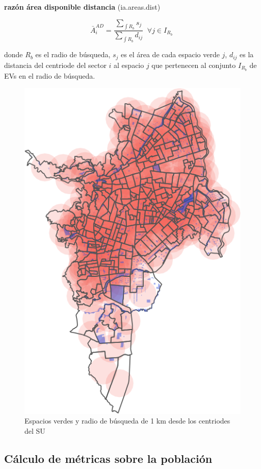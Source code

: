 \documentclass[12pt,a4paper,openany]{book}
\theoremstyle{definition}
\theoremstyle{definition}
\theoremstyle{definition}
\theoremstyle{remark}
\begin{document}
\textbf{razón área disponible distancia} (ia.areas.dist)

\begin{equation}
\bar{A}^{AD}_i= \frac{\sum_{\int R_b }{s_j}}{\sum_{\int R_b }{d_{ij}}}  \;  \; \forall  j \in I_{R_b} \; 
\label{eq:areas-dists}
\end{equation}

donde \(R_b\) es el radio de búsqueda, \(s_j\) es el área de cada
espacio verde \(j\), \(d_{ij}\) es la distancia del centriode del sector
\(i\) al espacio \(j\) que pertenecen al conjunto \(I_{R_b}\) de EVs en
el radio de búsqueda.

\begin{figure}[H]

{\centering \includegraphics[width=0.7\linewidth]{tesis-unigis_files/figure-latex/mapa-rango1km-1} 

}

\caption{Espacios verdes y radio de búsqueda de 1 km desde los centriodes del SU}\label{fig:mapa-rango1km}
\end{figure}

\subsection{Cálculo de métricas sobre la
población}\label{cuxe1lculo-de-muxe9tricas-sobre-la-poblaciuxf3n}
\end{document}
